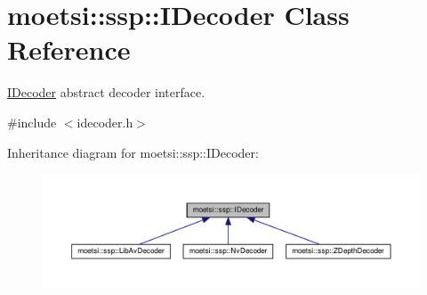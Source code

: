 \hypertarget{classmoetsi_1_1ssp_1_1IDecoder}{}\section{moetsi\+:\+:ssp\+:\+:I\+Decoder Class Reference}
\label{classmoetsi_1_1ssp_1_1IDecoder}


\hyperlink{classmoetsi_1_1ssp_1_1IDecoder}{I\+Decoder} abstract decoder interface.  




{\ttfamily \#include $<$idecoder.\+h$>$}



Inheritance diagram for moetsi\+:\+:ssp\+:\+:I\+Decoder\+:\nopagebreak
\begin{figure}[H]
\begin{center}
\leavevmode
\includegraphics[width=350pt]{classmoetsi_1_1ssp_1_1IDecoder__inherit__graph}
\end{center}
\end{figure}
